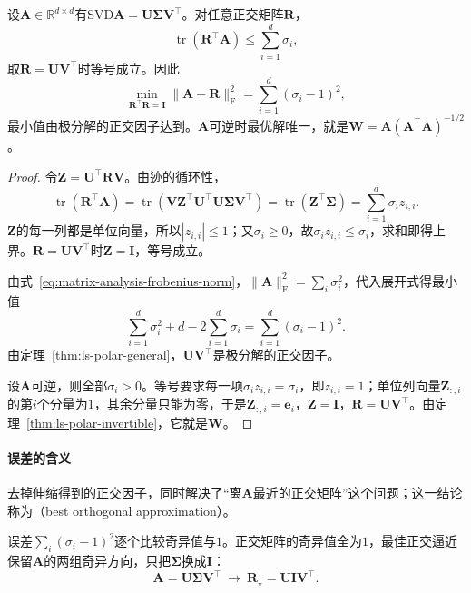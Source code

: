 \begin{theorem}[最佳正交逼近]
\label{thm:ls-best-orthogonal-approximation}
设$\bm A\in\mathbb R^{d\times d}$有SVD$\bm A=\bm U\bm\Sigma\bm V^\top$。对任意正交矩阵$\bm R$，
\begin{equation}
 \operatorname{tr}(\bm R^\top\bm A)\leq\sum_{i=1}^d\sigma_i ,
 \label{eq:matrix-approximation-orthogonal-trace-bound}
\end{equation}
取$\bm R=\bm U\bm V^\top$时等号成立。因此
\begin{equation}
 \min_{\bm R^\top\bm R=\bm I}\lVert\bm A-\bm R\rVert_{\mathrm F}^2
 =\sum_{i=1}^d(\sigma_i-1)^2 ,
 \label{eq:matrix-approximation-orthogonal-min-error}
\end{equation}
最小值由极分解的正交因子达到。$\bm A$可逆时最优解唯一，就是$\bm W=\bm A(\bm A^\top\bm A)^{-1/2}$。
\end{theorem}
\begin{proof}
令$\bm Z=\bm U^\top\bm R\bm V$。由迹的循环性，
\[
 \operatorname{tr}(\bm R^\top\bm A)
 =\operatorname{tr}(\bm V\bm Z^\top\bm U^\top\bm U\bm\Sigma\bm V^\top)
 =\operatorname{tr}(\bm Z^\top\bm\Sigma)
 =\sum_{i=1}^d\sigma_iz_{i,i}.
\]
$\bm Z$的每一列都是单位向量，所以$|z_{i,i}|\leq1$；又$\sigma_i\geq0$，故$\sigma_iz_{i,i}\leq\sigma_i$，求和即得上界。$\bm R=\bm U\bm V^\top$时$\bm Z=\bm I$，等号成立。

由式~\eqref{eq:matrix-analysis-frobenius-norm}，$\lVert\bm A\rVert_{\mathrm F}^2=\sum_i\sigma_i^2$，代入展开式得最小值
\[
 \sum_{i=1}^d\sigma_i^2+d-2\sum_{i=1}^d\sigma_i
 =\sum_{i=1}^d(\sigma_i-1)^2 .
\]
由定理~\ref{thm:ls-polar-general}，$\bm U\bm V^\top$是极分解的正交因子。

设$\bm A$可逆，则全部$\sigma_i>0$。等号要求每一项$\sigma_iz_{i,i}=\sigma_i$，即$z_{i,i}=1$；单位列向量$\bm Z_{:,i}$的第$i$个分量为$1$，其余分量只能为零，于是$\bm Z_{:,i}=\bm e_i$，$\bm Z=\bm I$，$\bm R=\bm U\bm V^\top$。由定理~\ref{thm:ls-polar-invertible}，它就是$\bm W$。
\end{proof}

\paragraph{误差的含义}
去掉伸缩得到的正交因子，同时解决了“离$\bm A$最近的正交矩阵”这个问题；这一结论称为（best orthogonal approximation）。

误差$\sum_i(\sigma_i-1)^2$逐个比较奇异值与$1$。正交矩阵的奇异值全为$1$，最佳正交逼近保留$\bm A$的两组奇异方向，只把$\bm\Sigma$换成$\bm I$：
\[
 \bm A=\bm U\bm\Sigma\bm V^\top\ \longrightarrow\ \bm R_\star=\bm U\bm I\bm V^\top .
\]

